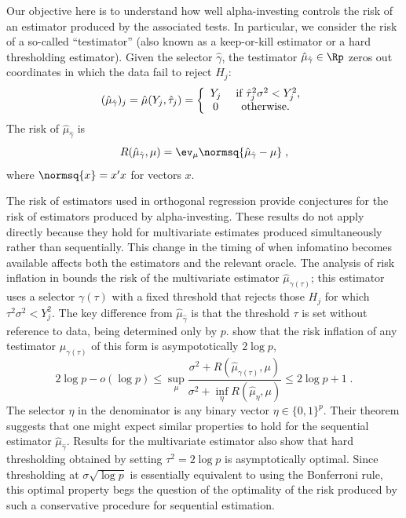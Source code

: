 \documentclass[12pt]{article}
\begin{document}
 
 Our objective here is to understand how well alpha-investing controls the risk
 of an estimator produced by the associated tests.  In particular, we consider
 the risk of a so-called ``testimator'' (also known as a keep-or-kill estimator
 or a hard thresholding estimator).  Given the selector $\hat\gamma$, the
 testimator $\hat\mu_{\hat\gamma} \in \Rp$ zeros out coordinates in which the
 data fail to reject $H_j$:
 \begin{equation}
   (\hat\mu_{\hat\gamma})_j 
          = \hat\mu(Y_j, \hat\tau_j) 
          = \left\{ \begin{array}{cc}
                                Y_j & \mbox{ if } \hat\tau_j^2 \sigma^2 < Y_j^2,  \cr
                                 0  & \mbox{ otherwise. }
                              \end{array}\right.
 \label{eq:muhat}
 \end{equation}
 The risk of $\hat\mu_{\hat\gamma}$ is
 \begin{equation}
    R(\hat\mu_{\hat\gamma}, \mu) 
      = \ev_\mu \normsq{\hat\mu_{\hat\gamma} - \mu} \;,
 \label{eq:risk}
 \end{equation}
 where $\normsq{x} = x'x$ for vectors $x$. 


 The risk of estimators used in orthogonal regression provide conjectures for
 the risk of estimators produced by alpha-investing.  These results do not apply
 directly because they hold for multivariate estimates produced simultaneously
 rather than sequentially.  This change in the timing of when infomatino becomes
 available affects both the estimators and the relevant oracle.  The analysis of
 risk inflation in \citet{fostergeorge94} bounds the risk of the multivariate
 estimator $\hat\mu_{\gamma(\tau)}$; this estimator uses a selector
 $\gamma(\tau)$ with a fixed threshold that rejects those $H_j$ for which
 $\tau^2 \sigma^2 < Y_j^2$.  The key difference from $\hat\mu_{\hat\gamma}$ is
 that the threshold $\tau$ is set without reference to data, being determined
 only by $p$.  \citet{fostergeorge94} show that the risk inflation of any
 testimator $\hat\mu_{\gamma(\tau)}$ of this form is asympototically $2 \log p$,
 \begin{equation}
    2 \log p - o(\log p) 
    \le
    \sup_\mu  \frac{\sigma^2 + R(\hat\mu_{\gamma(\tau)}, \mu)}
                   {\sigma^2 + \inf_\eta{R(\hat\mu_\eta, \mu)}}  
    \le 
    2 \log p + 1 \;.
 \label{eq:ri}
 \end{equation}
 The selector $\eta$ in the denominator is any binary vector $\eta \in
 \{0,1\}^p$.  Their theorem \citep[and the related results
 in][]{donohojohnstone94} suggests that one might expect similar properties to
 hold for the sequential estimator $\hat\mu_{\hat\gamma}$.  Results for the
 multivariate estimator also show that hard thresholding obtained by setting
 $\tau^2 = 2 \log p$ is asymptotically optimal.  Since thresholding at $\sigma
 \sqrt{\log p}$ is essentially equivalent to using the Bonferroni rule, this
 optimal property begs the question of the optimality of the risk produced by
 such a conservative procedure for sequential estimation.
\end{document}
